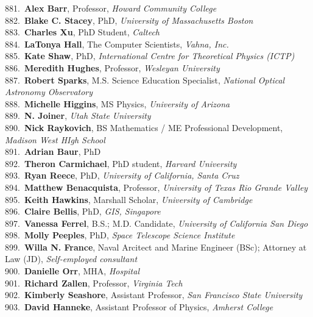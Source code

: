 881.~{\bf Alex Barr}, Professor, {\sl Howard Community College} \\
882.~{\bf Blake C. Stacey}, PhD, {\sl University of Massachusetts Boston} \\
883.~{\bf Charles Xu}, PhD Student, {\sl Caltech} \\
884.~{\bf LaTonya Hall}, The Computer Scientists, {\sl Vahna, Inc.} \\
885.~{\bf Kate Shaw}, PhD, {\sl International Centre for Theoretical Physics (ICTP)} \\
886.~{\bf Meredith Hughes}, Professor, {\sl Wesleyan University} \\
887.~{\bf Robert Sparks}, M.S. Science Education Specialist, {\sl National Optical Astronomy Observatory} \\
888.~{\bf Michelle Higgins}, MS Physics, {\sl University of Arizona} \\
889.~{\bf N. Joiner}, {\sl Utah State University} \\
890.~{\bf Nick Raykovich}, BS Mathematics / ME Professional Development, {\sl Madison West HIgh School} \\
891.~{\bf Adrian Baur}, PhD \\
892.~{\bf Theron Carmichael}, PhD student, {\sl Harvard University} \\
893.~{\bf Ryan Reece}, PhD, {\sl University of California, Santa Cruz} \\
894.~{\bf Matthew Benacquista}, Professor, {\sl University of Texas Rio Grande Valley} \\
895.~{\bf Keith Hawkins}, Marshall Scholar, {\sl University of Cambridge} \\
896.~{\bf Claire Bellis}, PhD, {\sl GIS, Singapore} \\
897.~{\bf Vanessa Ferrel}, B.S.; M.D. Candidate, {\sl University of California San Diego} \\
898.~{\bf Molly Peeples}, PhD, {\sl Space Telescope Science Institute} \\
899.~{\bf Willa N. France}, Naval Arcitect and Marine Engineer (BSc); Attorney at Law (JD), {\sl Self-employed consultant } \\
900.~{\bf Danielle Orr}, MHA, {\sl Hospital} \\
901.~{\bf Richard Zallen}, Professor, {\sl Virginia Tech} \\
902.~{\bf Kimberly Seashore}, Assistant Professor, {\sl San Francisco State University} \\
903.~{\bf David Hanneke}, Assistant Professor of Physics, {\sl Amherst College} \\
